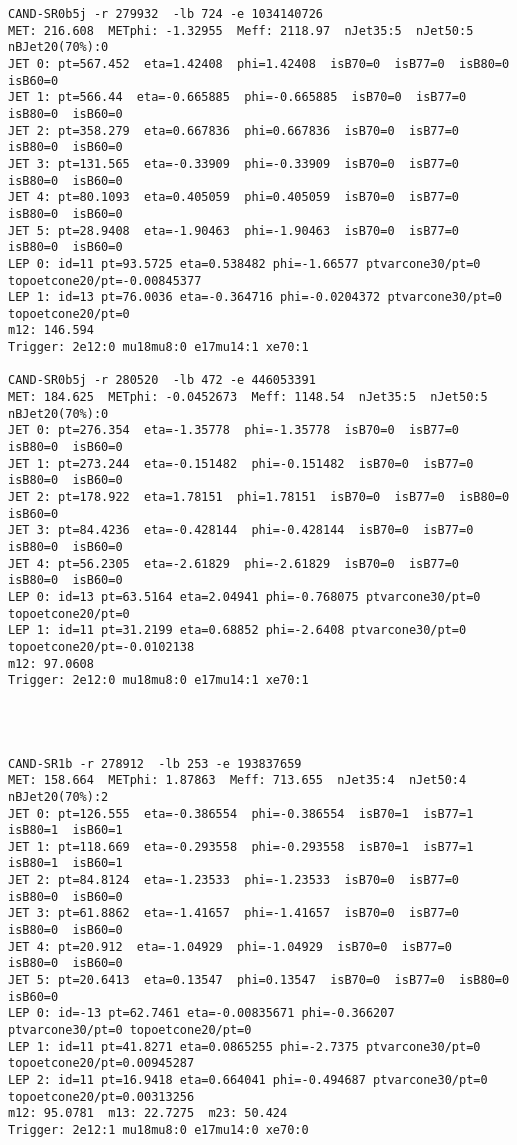 \begin{footnotesize}
\begin{verbatim}
CAND-SR0b5j -r 279932  -lb 724 -e 1034140726 
MET: 216.608  METphi: -1.32955  Meff: 2118.97  nJet35:5  nJet50:5  nBJet20(70%):0  
JET 0: pt=567.452  eta=1.42408  phi=1.42408  isB70=0  isB77=0  isB80=0  isB60=0
JET 1: pt=566.44  eta=-0.665885  phi=-0.665885  isB70=0  isB77=0  isB80=0  isB60=0
JET 2: pt=358.279  eta=0.667836  phi=0.667836  isB70=0  isB77=0  isB80=0  isB60=0
JET 3: pt=131.565  eta=-0.33909  phi=-0.33909  isB70=0  isB77=0  isB80=0  isB60=0
JET 4: pt=80.1093  eta=0.405059  phi=0.405059  isB70=0  isB77=0  isB80=0  isB60=0
JET 5: pt=28.9408  eta=-1.90463  phi=-1.90463  isB70=0  isB77=0  isB80=0  isB60=0
LEP 0: id=11 pt=93.5725 eta=0.538482 phi=-1.66577 ptvarcone30/pt=0 topoetcone20/pt=-0.00845377
LEP 1: id=13 pt=76.0036 eta=-0.364716 phi=-0.0204372 ptvarcone30/pt=0 topoetcone20/pt=0
m12: 146.594
Trigger: 2e12:0 mu18mu8:0 e17mu14:1 xe70:1

CAND-SR0b5j -r 280520  -lb 472 -e 446053391 
MET: 184.625  METphi: -0.0452673  Meff: 1148.54  nJet35:5  nJet50:5  nBJet20(70%):0  
JET 0: pt=276.354  eta=-1.35778  phi=-1.35778  isB70=0  isB77=0  isB80=0  isB60=0
JET 1: pt=273.244  eta=-0.151482  phi=-0.151482  isB70=0  isB77=0  isB80=0  isB60=0
JET 2: pt=178.922  eta=1.78151  phi=1.78151  isB70=0  isB77=0  isB80=0  isB60=0
JET 3: pt=84.4236  eta=-0.428144  phi=-0.428144  isB70=0  isB77=0  isB80=0  isB60=0
JET 4: pt=56.2305  eta=-2.61829  phi=-2.61829  isB70=0  isB77=0  isB80=0  isB60=0
LEP 0: id=13 pt=63.5164 eta=2.04941 phi=-0.768075 ptvarcone30/pt=0 topoetcone20/pt=0
LEP 1: id=11 pt=31.2199 eta=0.68852 phi=-2.6408 ptvarcone30/pt=0 topoetcone20/pt=-0.0102138
m12: 97.0608
Trigger: 2e12:0 mu18mu8:0 e17mu14:1 xe70:1




CAND-SR1b -r 278912  -lb 253 -e 193837659 
MET: 158.664  METphi: 1.87863  Meff: 713.655  nJet35:4  nJet50:4  nBJet20(70%):2  
JET 0: pt=126.555  eta=-0.386554  phi=-0.386554  isB70=1  isB77=1  isB80=1  isB60=1
JET 1: pt=118.669  eta=-0.293558  phi=-0.293558  isB70=1  isB77=1  isB80=1  isB60=1
JET 2: pt=84.8124  eta=-1.23533  phi=-1.23533  isB70=0  isB77=0  isB80=0  isB60=0
JET 3: pt=61.8862  eta=-1.41657  phi=-1.41657  isB70=0  isB77=0  isB80=0  isB60=0
JET 4: pt=20.912  eta=-1.04929  phi=-1.04929  isB70=0  isB77=0  isB80=0  isB60=0
JET 5: pt=20.6413  eta=0.13547  phi=0.13547  isB70=0  isB77=0  isB80=0  isB60=0
LEP 0: id=-13 pt=62.7461 eta=-0.00835671 phi=-0.366207 ptvarcone30/pt=0 topoetcone20/pt=0
LEP 1: id=11 pt=41.8271 eta=0.0865255 phi=-2.7375 ptvarcone30/pt=0 topoetcone20/pt=0.00945287
LEP 2: id=11 pt=16.9418 eta=0.664041 phi=-0.494687 ptvarcone30/pt=0 topoetcone20/pt=0.00313256
m12: 95.0781  m13: 22.7275  m23: 50.424
Trigger: 2e12:1 mu18mu8:0 e17mu14:0 xe70:0



\end{verbatim}
\end{footnotesize}
